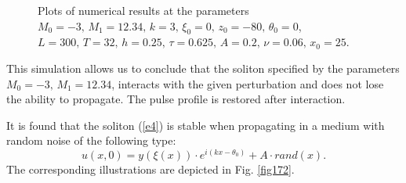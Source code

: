 \documentclass[preprint,12pt]{elsarticle}
\begin{document}
\begin{figure}[H]
\begin{center}
\begin{minipage}[h]{0.48\linewidth}
\end{minipage}
\end{center}
\caption{Plots of numerical results at the parameters \(M_{0}=-3,\,M_{1}=12.34,\, k=3,\, \xi_{0}=0,\,z_{0}=-80,\, \theta_{0}=0\), \\
\(L=300,\, T=32,\, h=0.25,\, \tau=0.625,\,A=0.2,\,\nu=0.06,\, x_{0}=25\).}
\label{fig17}
\end{figure}
This simulation allows us to conclude that the soliton specified by the parameters \(M_{0}=-3,\,M_{1}=12.34\), interacts with the given perturbation and does not lose the ability to propagate. The pulse profile is restored after interaction.

It is found that the soliton (\ref{e4}) is stable when propagating in a medium with random noise of the following type:
\begin{equation} \label{eq522}
u(x,0)=y\left(\xi\left(x\right)\right)\cdot e^{i(kx-\theta_{0})}+A\cdot rand(x).
\end{equation}
The corresponding illustrations are depicted in Fig. \ref{fig172}.	
\end{document}
